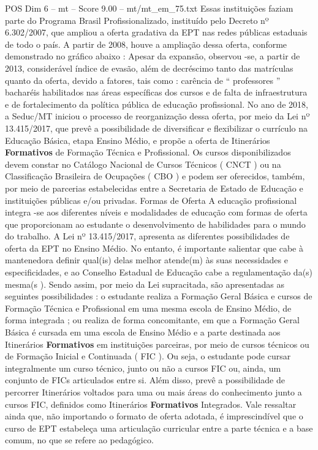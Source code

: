 \begin{textsample}{POS Dim 6 – mt – Score 9.00 – mt/mt\_em\_75.txt}
Essas instituições faziam parte do Programa Brasil Profissionalizado, instituído pelo Decreto nº 6.302/2007, que ampliou a oferta gradativa da EPT nas redes públicas estaduais de todo o país.
A partir de 2008, houve a ampliação dessa oferta, conforme demonstrado no gráfico abaixo : Apesar da expansão, observou -se, a partir de 2013, considerável índice de evasão, além de decréscimo tanto das matrículas quanto da oferta, devido a fatores, tais como : carência de “ professores ” bacharéis habilitados nas áreas específicas dos cursos e de falta de infraestrutura e de fortalecimento da política pública de educação profissional.
No ano de 2018, a Seduc/MT iniciou o processo de reorganização dessa oferta, por meio da Lei nº 13.415/2017, que prevê a possibilidade de diversificar e flexibilizar o currículo na Educação Básica, etapa Ensino Médio, e propõe a oferta de Itinerários \textbf{Formativos} de Formação Técnica e Profissional.
Os cursos disponibilizados devem constar no Catálogo Nacional de Cursos Técnicos ( CNCT ) ou na Classificação Brasileira de Ocupações ( CBO ) e podem ser oferecidos, também, por meio de parcerias estabelecidas entre a Secretaria de Estado de Educação e instituições públicas e/ou privadas.
Formas de Oferta A educação profissional integra -se aos diferentes níveis e modalidades de educação com formas de oferta que proporcionam ao estudante o desenvolvimento de habilidades para o mundo do trabalho.
A Lei nº 13.415/2017, apresenta as diferentes possibilidades de oferta da EPT no Ensino Médio.
No entanto, é importante salientar que cabe à mantenedora definir qual(is) delas melhor atende(m) às suas necessidades e especificidades, e ao Conselho Estadual de Educação cabe a regulamentação da(s) mesma(s ).
Sendo assim, por meio da Lei supracitada, são apresentadas as seguintes possibilidades : o estudante realiza a Formação Geral Básica e cursos de Formação Técnica e Profissional em uma mesma escola de Ensino Médio, de forma integrada ; ou realiza de forma concomitante, em que a Formação Geral Básica é cursada em uma escola de Ensino Médio e a parte destinada aos Itinerários \textbf{Formativos} em instituições parceiras, por meio de cursos técnicos ou de Formação Inicial e Continuada ( FIC ).
Ou seja, o estudante pode cursar integralmente um curso técnico, junto ou não a cursos FIC ou, ainda, um conjunto de FICs articulados entre si.
Além disso, prevê a possibilidade de percorrer Itinerários voltados para uma ou mais áreas do conhecimento junto a cursos FIC, definidos como Itinerários \textbf{Formativos} Integrados.
Vale ressaltar ainda que, não importando o formato de oferta adotada, é imprescindível que o curso de EPT estabeleça uma articulação curricular entre a parte técnica e a base comum, no que se refere ao pedagógico.

\end{textsample}
